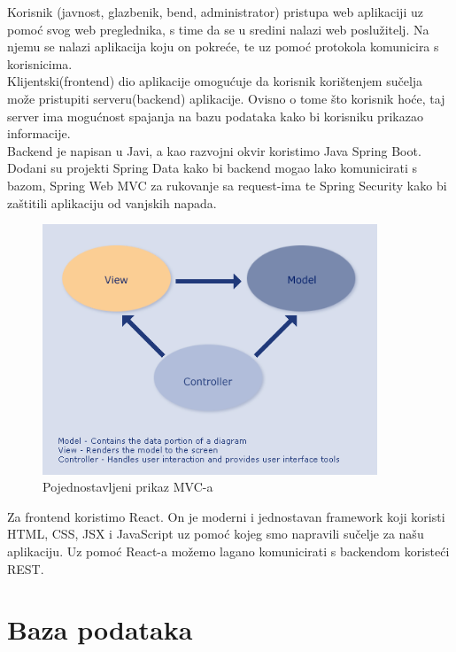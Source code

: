 	Korisnik (javnost, glazbenik, bend, administrator) pristupa web aplikaciji uz pomoć svog web preglednika, s time da se u sredini nalazi web poslužitelj. Na njemu se nalazi aplikacija koju on pokreće, te uz pomoć protokola komunicira s korisnicima.\\

	Klijentski(frontend) dio aplikacije omogućuje da korisnik korištenjem sučelja može pristupiti serveru(backend) aplikacije. Ovisno o tome što korisnik hoće, taj server ima mogućnost spajanja na bazu podataka kako bi korisniku prikazao informacije.\\

	Backend je napisan u Javi, a kao razvojni okvir koristimo Java Spring Boot. Dodani su projekti Spring Data kako bi backend mogao lako komunicirati s bazom, Spring Web MVC za rukovanje sa request-ima te Spring Security kako bi zaštitili aplikaciju od vanjskih napada. \\

	\begin{figure}[H]
		\begin{center}
			\includegraphics[width=10cm]{slike/mvc.PNG}
		\end{center}
		\caption{Pojednostavljeni prikaz MVC-a}
		\label{fig:mvc}
	\end{figure}

	Za frontend koristimo React. On je moderni i jednostavan framework koji koristi HTML, CSS, JSX i JavaScript uz pomoć kojeg smo napravili sučelje za našu aplikaciju. Uz pomoć React-a možemo lagano komunicirati s backendom koristeći REST.\\




		\section{Baza podataka}
			
